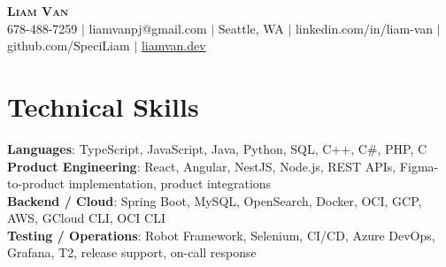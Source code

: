 \documentclass[letterpaper,11pt]{article}
\begin{document}

%
\begin{center}
    \textbf{\Huge \scshape Liam Van} \\ \vspace{1pt}
    \small 678-488-7259 $|$ liamvanpj@gmail.com $|$ Seattle, WA $|$
    linkedin.com/in/liam-van $|$ github.com/SpeciLiam $|$ \href{https://liamvan.dev}{liamvan.dev}

\end{center}

\section{Technical Skills}
 \begin{itemize}[leftmargin=0.15in, label={}]
    \small{\item{
     \textbf{Languages}{: TypeScript, JavaScript, Java, Python, SQL, C++, C\#, PHP, C} \\
     \textbf{Product Engineering}{: React, Angular, NestJS, Node.js, REST APIs, Figma-to-product implementation, product integrations} \\
     \textbf{Backend / Cloud}{: Spring Boot, MySQL, OpenSearch, Docker, OCI, GCP, AWS, GCloud CLI, OCI CLI} \\
     \textbf{Testing / Operations}{: Robot Framework, Selenium, CI/CD, Azure DevOps, Grafana, T2, release support, on-call response} \\
    }}
 \end{itemize}
%

\end{document}
